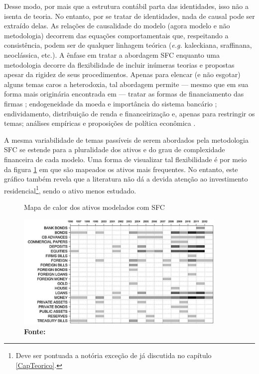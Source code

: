 Desse modo, por mais que a estrutura contábil parta das identidades, isso não a isenta de teoria. No entanto, por se tratar de identidades, nada de causal pode ser extraído delas. As relações de causalidade do modelo (agora modelo e não metodologia) decorrem das equações comportamentais que, respeitando a consistência, podem ser de qualquer linhagem teórica (\textit{e.g.} kaleckiana, sraffinana, neoclássica, etc.). A ênfase em tratar a abordagem SFC enquanto uma metodologia decorre da flexibilidade de incluir inúmeras teorias e propostas apesar da rigidez de seus procedimentos. Apenas para elencar (e não esgotar) alguns temas caros a heterodoxia, tal abordagem permite --- mesmo que em sua forma mais originária encontrada em \textcite{godley_macroeconomics_1983} --- tratar as formas de financiamento das firmas \cites{asimakopulos_kalecki_1983}{skott_finance_1988}{messori_financing_1991}; endogeneidade da moeda e importância do sistema bancário \cites{messori_financing_1991}{dow_horizontalism:_1996}{arestis_theoretical_1996}{godley_money_1999}{lavoie_note_1999}{lima_macrodynamics_2007}; endividamento, distribuição de renda e financeirização \cites{palley_inside_1996}{wolfson_irving_1996}{palley_money_1997}{palley_financial_2002}{dos_santos_revisiting_2009}{palley_inside_2010}{hein_finance-dominated_2012} e, apenas para restringir os temas; análises empíricas e proposições de política econômica \cites{godley_seven_1999}{godley_fiscal_2007}{godley_simple_2007}{arestis_income_2011}{zezza_design_2019}. 

A mesma variabilidade de temas passíveis de serem abordados pela metodologia SFC se estende para a pluralidade dos ativos e do grau de complexidade financeira de cada modelo. Uma forma de visualizar tal flexibilidade é por meio da figura \ref{Heatmap} em que são mapeados os ativos mais frequentes. No entanto, este gráfico também revela que a literatura não dá a devida atenção ao investimento residencial\footnote{Deve ser pontuada a notória exceção de \textcite{zezza_u.s._2008} já discutida no capítulo \ref{CapTeorico}.}, sendo o ativo menos estudado. 
\begin{figure}
    \centering
    \caption{Mapa de calor dos ativos modelados com SFC}
    \label{Heatmap}
    \includegraphics[width = 0.9\textwidth]{Modelo/Caverzassi_Heatmap.png}
    \caption*{\textbf{Fonte:} \textcite[p.~4]{caverzasi_stock-flow_2013}}
\end{figure}


